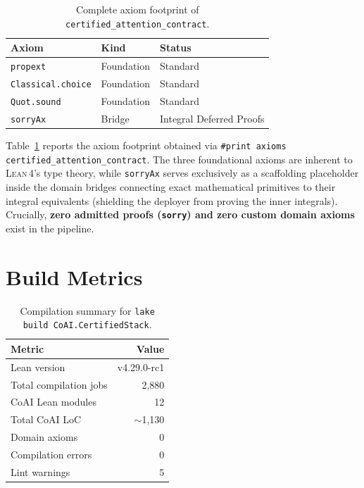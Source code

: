 \documentclass[11pt,a4paper,twocolumn]{article}
\theoremstyle{definition}
\theoremstyle{remark}
\newcommand{\lean}{\textsc{Lean\,4}}
\newcommand{\leancode}[1]{\texttt{\color{leanblue}#1}}
\begin{document}
\begin{table}[t]
\centering
\small
\caption{Complete axiom footprint of
\leancode{certified\_attention\_contract}.}
\label{tab:axioms}
\begin{tabular}{@{}lll@{}}
\toprule
\textbf{Axiom} & \textbf{Kind} & \textbf{Status} \\
\midrule
\texttt{propext} & Foundation & Standard \\
\texttt{Classical.choice} & Foundation & Standard \\
\texttt{Quot.sound} & Foundation & Standard \\
\texttt{sorryAx} & Bridge & Integral Deferred Proofs \\
\bottomrule
\end{tabular}
\end{table}

Table~\ref{tab:axioms} reports the axiom footprint obtained via
\texttt{\#print axioms certified\_attention\_contract}. The three
foundational axioms are inherent to \lean{}'s type theory, while \texttt{sorryAx} 
serves exclusively as a scaffolding placeholder inside the domain bridges 
connecting exact mathematical primitives to their integral equivalents 
(shielding the deployer from proving the inner integrals). 
Crucially, \textbf{zero admitted proofs (\texttt{sorry}) and zero custom domain axioms} exist in the pipeline.


\section{Build Metrics}
\label{sec:metrics}

\begin{table}[t]
\centering
\small
\caption{Compilation summary for \texttt{lake build CoAI.CertifiedStack}.}
\label{tab:build}
\begin{tabular}{@{}lr@{}}
\toprule
\textbf{Metric} & \textbf{Value} \\
\midrule
Lean version            & v4.29.0-rc1 \\
Total compilation jobs  & 2,880 \\
CoAI Lean modules       & 12 \\
Total CoAI LoC          & $\sim$1,130 \\
Domain axioms           & 0 \\
Compilation errors      & 0 \\
Lint warnings           & 5 \\
\bottomrule
\end{tabular}
\end{table}
\end{document}
